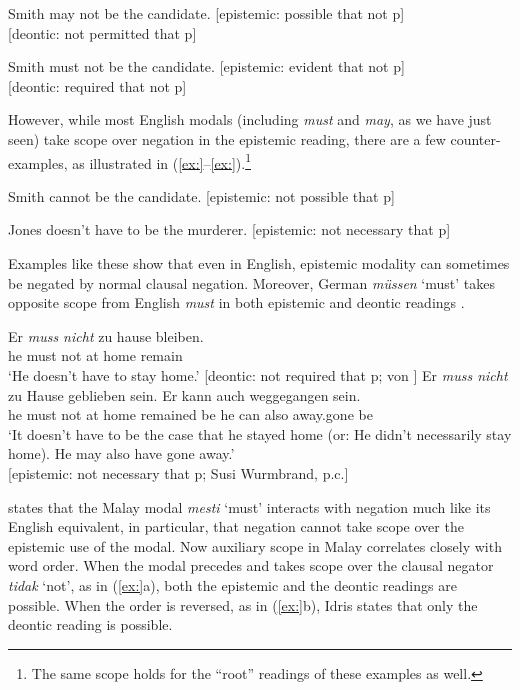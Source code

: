 \ea
Smith may not be the candidate.  [epistemic: possible that not p]\\
  {}[deontic: not permitted that p]
\z

\ea
Smith must not be the candidate.  [epistemic: evident that not p]\\
  {}[deontic: required that not p]
\z


However, while most English modals (including \textit{must} and \textit{may}, as we have just seen) take scope over negation in the epistemic reading, there are a few counter-examples, as illustrated in (\ref{ex:}--\ref{ex:}).\footnote{The same scope holds for the “root” readings of these examples as well.}


\ea
Smith cannot be the candidate.  [epistemic: not possible that p]
\z

\ea
Jones doesn’t have to be the murderer.  [epistemic: not necessary that p]
\z


Examples like these show that even in English, epistemic modality can sometimes be negated by normal clausal negation. Moreover, German \textit{müssen} ‘must’ takes opposite scope from English \textit{must} in both epistemic and deontic readings .


\ea
\ea  \gll Er  \textit{muss  nicht}  zu  hause  bleiben.\\
he  must  not  at  home  remain\\
\glt ‘He doesn’t have to stay home.’   [deontic: not required that p; von \citet{Fintel2006}]
\ex \gll Er  \textit{muss  nicht}  zu  Hause  geblieben  sein.  Er  kann  auch  weggegangen  sein.\\
he  must  not  at  home  remained  be  he  can  also  away.gone  be\\
\glt ‘It doesn’t have to be the case that he stayed home (or: He didn’t necessarily stay home). He may also have gone away.’\\
{}[epistemic: not necessary that p; Susi Wurmbrand, p.c.]
\z \z


\citet{Idris1980} states that the Malay modal \textit{mesti} ‘must’ interacts with negation much like its English equivalent, in particular, that negation cannot take scope over the epistemic use of the modal. Now auxiliary scope in Malay correlates closely with word order. When the modal precedes and takes scope over the clausal negator \textit{tidak} ‘not’, as in (\ref{ex:}a), both the epistemic and the deontic readings are possible. When the order is reversed, as in (\ref{ex:}b), Idris states that only the deontic reading is possible.


